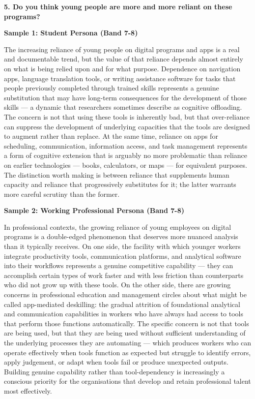 \separator

\begin{ieltsquestion}
\textbf{5. Do you think young people are more and more reliant on these programs?}
\end{ieltsquestion}
\textbf{Sample 1: Student Persona (Band 7-8)}

The increasing reliance of young people on digital programs and apps is a real and documentable trend, but the value of that reliance depends almost entirely on what is being relied upon and for what purpose. Dependence on navigation apps, language translation tools, or writing assistance software for tasks that people previously completed through trained skills represents a genuine substitution that may have long-term consequences for the development of those skills — a dynamic that researchers sometimes describe as cognitive offloading. The concern is not that using these tools is inherently bad, but that over-reliance can suppress the development of underlying capacities that the tools are designed to augment rather than replace. At the same time, reliance on apps for scheduling, communication, information access, and task management represents a form of cognitive extension that is arguably no more problematic than reliance on earlier technologies — books, calculators, or maps — for equivalent purposes. The distinction worth making is between reliance that supplements human capacity and reliance that progressively substitutes for it; the latter warrants more careful scrutiny than the former.

\textbf{Sample 2: Working Professional Persona (Band 7-8)}

In professional contexts, the growing reliance of young employees on digital programs is a double-edged phenomenon that deserves more nuanced analysis than it typically receives. On one side, the facility with which younger workers integrate productivity tools, communication platforms, and analytical software into their workflows represents a genuine competitive capability — they can accomplish certain types of work faster and with less friction than counterparts who did not grow up with these tools. On the other side, there are growing concerns in professional education and management circles about what might be called app-mediated deskilling: the gradual attrition of foundational analytical and communication capabilities in workers who have always had access to tools that perform those functions automatically. The specific concern is not that tools are being used, but that they are being used without sufficient understanding of the underlying processes they are automating — which produces workers who can operate effectively when tools function as expected but struggle to identify errors, apply judgement, or adapt when tools fail or produce unexpected outputs. Building genuine capability rather than tool-dependency is increasingly a conscious priority for the organisations that develop and retain professional talent most effectively.

